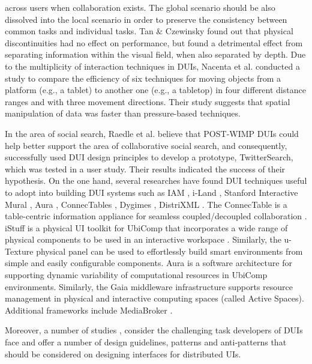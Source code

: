 across users when collaboration exists. The global scenario should be also
dissolved into the local scenario in order to preserve the consistency between
common tasks and individual tasks. Tan & Czewinsky \cite{tan2003effects} found
out that physical discontinuities had no effect on performance, but found a
detrimental effect from separating information within the visual field, when
also separated by depth. Due to the multiplicity of interaction techniques in
DUIs, Nacenta et al. conducted a study to compare the efficiency of six
techniques for moving objects from a platform (e.g., a tablet) to another one (e.g., a tabletop) in four different distance ranges and with three movement directions.
Their study suggests that spatial manipulation of data was faster than pressure-based techniques.\par
In the area of social search, Raedle et al. \cite{radle2013twistersearch}
believe that POST-WIMP DUIs could help better support the area of collaborative
social search, and consequently, successfully used DUI design principles to 
develop a prototype, TwitterSearch, which was tested in a user study. Their
results indicated the success of their hypothesis.
On the one hand, several researches have
found DUI techniques useful to adopt into building DUI systems such as IAM
\cite{coutaz2003software}, i-Land \cite{streitz1999land}, Stanford Interactive
Mural \cite{guimbretiere2001fluid}, Aura \cite{sousa2002aura}, ConnecTables
\cite{tandler2001connectables} , Dygimes \cite{vandervelpen2004towards},
DistriXML \cite{grolaux2004migratable}. The ConnecTable is a table-centric
information appliance for seamless coupled/decoupled collaboration
\cite{tandler2001connectables}. iStuff is a physical UI toolkit for UbiComp that
incorporates a wide range of physical components to be used in an interactive
workspace \cite{ballagas2003istuff}. Similarly, the u-Texture \cite{kohtake2005u}
physical panel can be used to effortlessly build smart environments from simple
and easily configurable components. Aura \cite{sousa2002aura} is a software architecture for supporting dynamic variability of computational resources in UbiComp environments.
Similarly, the Gaia \cite{roman2002middleware} middleware infrastructure supports resource
management in physical and interactive computing spaces (called Active Spaces). Additional
frameworks include MediaBroker \cite{modahl2004mediabroker}.\par
Moreover, a number of studies \cite{seifried2011lessons},
\cite{vanderdonckt2010distributed} consider the challenging task developers of
DUIs face and offer a number of design guidelines, patterns and anti-patterns
that should be considered on designing interfaces for distributed UIs.
